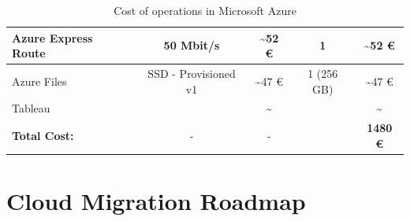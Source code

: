 \documentclass{llncs}
\begin{document}
\begin{table}[htbp]
\begin{tabular}{|l|c|c|c|c|}
        \hline
        Azure Express Route          & 50 Mbit/s                 & \textasciitilde 52 €             & 1          & \textasciitilde 52 €                            \\
        \hline
        Azure Files                 & SSD - Provisioned v1       & \textasciitilde 47 €             & 1 (256 GB)         & \textasciitilde 47 €                            \\
        \hline
        Tableau                    &                             & \textasciitilde                   &               & \textasciitilde                            \\
        \hline
        \textbf{Total Cost:}          &  -                            & -                  &               &  \textbf{1480  €}                          \\
        \hline
   
    \end{tabular}
    \caption{Cost of operations in Microsoft Azure}
    \label{tab:Cost_Operation_Monthly}
\end{table}

 
\section{Cloud Migration Roadmap}
\end{document}
